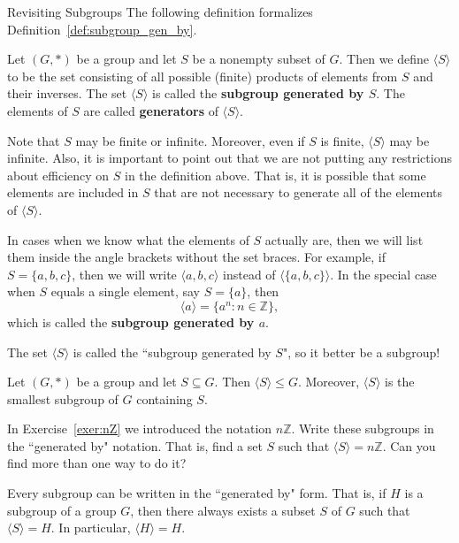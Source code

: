 \begin{section}{Revisiting Subgroups}
The following definition formalizes Definition~\ref{def:subgroup_gen_by}.

\begin{definition}
Let $(G,*)$ be a group and let $S$ be a nonempty subset of $G$.  Then we define $\langle S\rangle$ to be the set consisting of all possible (finite) products of elements from $S$ and their inverses.  The set $\langle S\rangle$ is called the \textbf{subgroup generated by $S$}.  The elements of $S$ are called \textbf{generators} of $\langle S\rangle$.
\end{definition}

Note that $S$ may be finite or infinite.  Moreover, even if $S$ is finite, $\langle S\rangle$ may be infinite.  Also, it is important to point out that we are not putting any restrictions about efficiency on $S$ in the definition above.  That is, it is possible that some elements are included in $S$ that are not necessary to generate all of the elements of $\langle S\rangle$.

In cases when we know what the elements of $S$ actually are, then we will list them inside the angle brackets without the set braces.  For example, if $S=\{a,b,c\}$, then we will write $\langle a, b, c\rangle$ instead of $\langle \{a,b,c\}\rangle$.  In the special case when $S$ equals a single element, say $S=\{a\}$, then
\[
\langle a\rangle =\{a^n:n\in\mathbb{Z}\},
\]
which is called the \textbf{subgroup generated by $a$}.  

The set $\langle S\rangle$ is called the ``subgroup generated by $S$", so it better be a subgroup!

\begin{theorem}
Let $(G,*)$ be a group and let $S\subseteq G$.  Then $\langle S\rangle \leq G$.  Moreover, $\langle S\rangle$ is the smallest subgroup of $G$ containing $S$.
\end{theorem}

\begin{exercise}
In Exercise~\ref{exer:nZ} we introduced the notation $n\mathbb{Z}$.  Write these subgroups in the ``generated by" notation.  That is, find a set $S$ such that $\langle S\rangle =n\mathbb{Z}$.  Can you find more than one way to do it?
\end{exercise}

Every subgroup can be written in the ``generated by" form.  That is, if $H$ is a subgroup of a group $G$, then there always exists a subset $S$ of $G$ such that $\langle S\rangle=H$.  In particular, $\langle H\rangle=H$.


\end{section}
